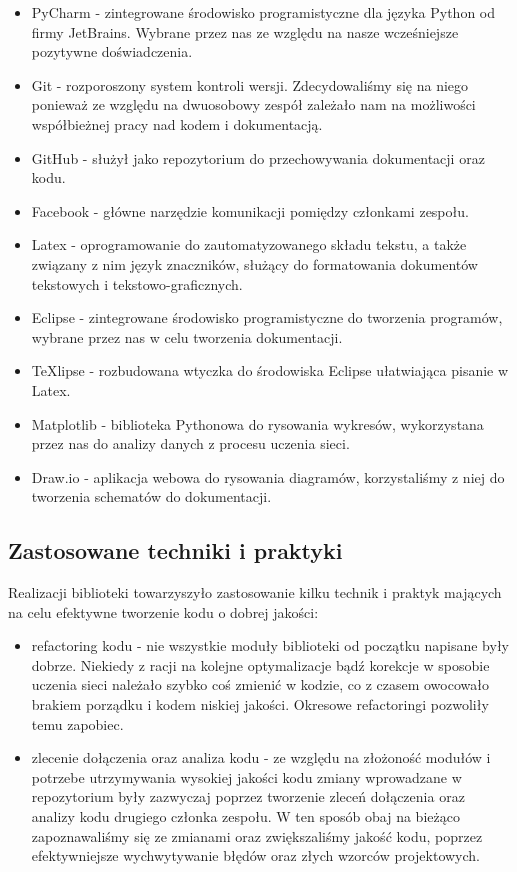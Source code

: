 \begin{itemize}
  \item PyCharm - zintegrowane środowisko programistyczne dla języka Python od firmy JetBrains.
  Wybrane przez nas ze względu na nasze wcześniejsze pozytywne doświadczenia.
  \item Git - rozporoszony system kontroli wersji. Zdecydowaliśmy się na niego ponieważ ze względu na 
  dwuosobowy zespół zależało nam na możliwości współbieżnej pracy nad kodem i dokumentacją.
  \item GitHub - służył jako repozytorium do przechowywania dokumentacji oraz kodu.
  \item Facebook - główne narzędzie komunikacji pomiędzy członkami zespołu.
  \item Latex - oprogramowanie do zautomatyzowanego składu tekstu, a także związany z nim język 
  znaczników, służący do formatowania dokumentów tekstowych i tekstowo-graficznych. 
  \item Eclipse - zintegrowane środowisko programistyczne do tworzenia programów, wybrane przez nas 
  w celu tworzenia dokumentacji.
  \item TeXlipse - rozbudowana wtyczka do środowiska Eclipse ułatwiająca pisanie w Latex.  
  \item Matplotlib - biblioteka Pythonowa do rysowania wykresów, wykorzystana przez nas do analizy danych 
  z procesu uczenia sieci. 
  \item Draw.io - aplikacja webowa do rysowania diagramów, korzystaliśmy z niej do tworzenia 
  schematów do dokumentacji.
\end{itemize}

\subsection{Zastosowane techniki i praktyki}
Realizacji biblioteki towarzyszyło zastosowanie kilku technik i praktyk mających na celu efektywne 
tworzenie kodu o dobrej jakości:
\begin{itemize}
  \item refactoring kodu - nie wszystkie moduły biblioteki od początku napisane były dobrze. Niekiedy z racji 
  na kolejne optymalizacje bądź korekcje w sposobie uczenia sieci należało szybko coś zmienić w kodzie,
  co z czasem owocowało brakiem porządku i kodem niskiej jakości. Okresowe refactoringi pozwoliły temu zapobiec.
  \item zlecenie dołączenia oraz analiza kodu - ze względu na złożoność modułów i potrzebe utrzymywania wysokiej
  jakości kodu zmiany wprowadzane w repozytorium były zazwyczaj poprzez tworzenie zleceń dołączenia oraz analizy kodu
  drugiego członka zespołu. W ten sposób obaj na bieżąco zapoznawaliśmy się ze zmianami oraz zwiększaliśmy
  jakość kodu, poprzez efektywniejsze wychwytywanie błędów oraz złych wzorców projektowych.
\end{itemize}

